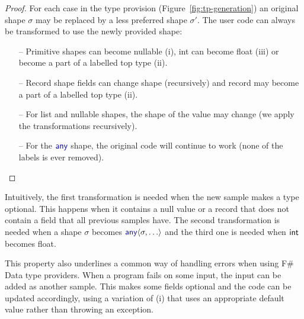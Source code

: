 \documentclass[pldi-cameraready]{sigplanconf-pldi16}
\newcommand{\kvd}[1]{\textnormal{\textcolor{kvdclr}{\sffamily #1}}}
\newcommand{\ident}[1]{\textnormal{\sffamily #1}}
\begin{document}
\begin{proof}
For each case in the type provision (Figure~\ref{fig:tp-generation}) an original shape $\sigma$
may be replaced by a less preferred shape $\sigma'$. The user code can always be transformed
to use the newly provided shape:

\begin{itemize}
\item[--] Primitive shapes can become nullable (i), \ident{int} can become \ident{float} (iii)
  or become a part of a labelled top type (ii).
\item[--] Record shape fields can change shape (recursively) and record may become a part
  of a labelled top type (ii).
\item[--] For list and nullable shapes, the shape of the value may change (we apply the
  transformations recursively).
\item[--] For the $\kvd{any}$ shape, the original code will continue to work (none of the labels is ever removed).
\end{itemize}
\vspace{-1.5em}
\end{proof}
%
\noindent
Intuitively, the first transformation is needed when the new sample makes a type optional.
This happens when it contains a \kvd{null} value or a record that does not contain a field
that all previous samples have. The second transformation is needed when a shape $\sigma$
becomes $\kvd{any}\langle\sigma, \ldots\rangle$ and the third one is needed when $\ident{int}$
becomes \ident{float}.

This property also underlines a common way of handling errors when using F\# Data type providers.
When a program fails on some input, the input can be added as another sample. This makes some
fields optional and the code can be updated accordingly, using a variation of (i) that uses
an appropriate default value rather than throwing an exception.



%
%
\end{document}
